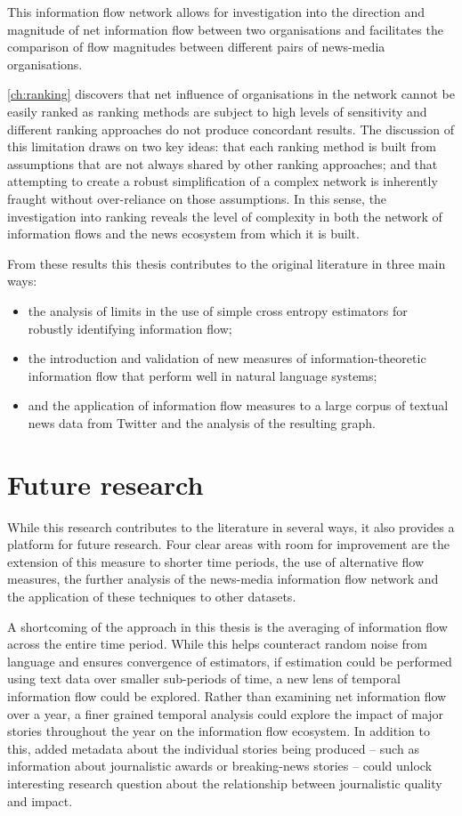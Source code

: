 This information flow network allows for investigation into the direction and magnitude of net information flow between two organisations and facilitates the comparison of flow magnitudes between different pairs of news-media organisations.

\autoref{ch:ranking} discovers that net influence of organisations in the network cannot be easily ranked as ranking methods are subject to high levels of sensitivity and different ranking approaches do not produce concordant results. The discussion of this limitation draws on two key ideas: that each ranking method is built from assumptions that are not always shared by other ranking approaches; and that attempting to create a robust simplification of a complex network is inherently fraught without over-reliance on those assumptions. In this sense, the investigation into ranking reveals the level of complexity in both the network of information flows and the news ecosystem from which it is built.


From these results this thesis contributes to the original literature in three main ways:
\begin{itemize}
	\item the analysis of limits in the use of simple cross entropy estimators for robustly identifying information flow;
	\item the introduction and validation of new measures of information-theoretic information flow that perform well in natural language systems;
	\item and the application of information flow measures to a large corpus of textual news data from Twitter and the analysis of the resulting graph.
\end{itemize}


\section{Future research}

While this research contributes to the literature in several ways, it also provides a platform for future research. Four clear areas with room for improvement are the extension of this measure to shorter time periods, the use of alternative flow measures, the further analysis of the news-media information flow network and the application of these techniques to other datasets.

A shortcoming of the approach in this thesis is the averaging of information flow across the entire time period. While this helps counteract random noise from language and ensures convergence of estimators, if estimation could be performed using text data over smaller sub-periods of time, a new lens of temporal information flow could be explored. Rather than examining net information flow over a year, a finer grained temporal analysis could explore the impact of major stories throughout the year on the information flow ecosystem. In addition to this, added metadata about the individual stories being produced -- such as information about journalistic awards or breaking-news stories -- could unlock interesting research question about the relationship between journalistic quality and impact.

